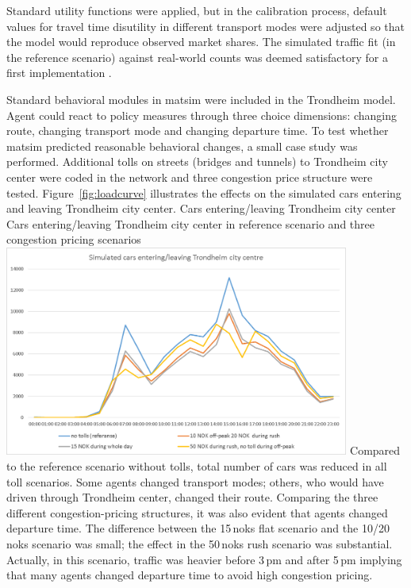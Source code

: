 Standard utility functions were applied, but in the calibration process, default values for travel time disutility in different transport modes were adjusted so that the model would reproduce observed market shares. The simulated traffic fit (in the reference scenario) against real-world counts was deemed satisfactory for a first implementation \citep[][]{Bockemuehl_TechRep_UH_2014}. 

Standard behavioral modules in \gls{matsim} were included in the Trondheim model. Agent could react to policy measures through three choice dimensions: changing route, changing transport mode and changing departure time. To test whether \gls{matsim} predicted reasonable behavioral changes, a small case study was performed. Additional tolls on streets (bridges and tunnels) to Trondheim city center were coded in the network and three congestion price structure were tested. Figure~\ref{fig:loadcurve} illustrates the effects on the simulated cars entering and leaving Trondheim city center. 
%
\createfigure%
{Cars entering/leaving Trondheim city center}%
{Cars entering/leaving Trondheim city center in reference scenario and three congestion pricing scenarios \citep[source][]{Bockemuehl_TechRep_UH_2014}}%
{\label{fig:loadcurve}}%
{\includegraphics[width=0.85\textwidth, angle=0]{./using/figures/trondheimloadcurve.png}}%
{}
%
Compared to the reference scenario without tolls, total number of cars was reduced in all toll scenarios. Some agents changed transport modes; others, who would have driven through Trondheim center, changed their route. Comparing the three different congestion-pricing structures, it was also evident that agents changed departure time. The difference between the 15\,\glspl{nok} flat scenario and the 10/20\,\glspl{nok} scenario was small; the effect in the 50\,\glspl{nok} rush scenario was substantial. Actually, in this scenario, traffic was heavier before 3\,pm and after 5\,pm implying that many agents changed departure time to avoid high congestion pricing.  











